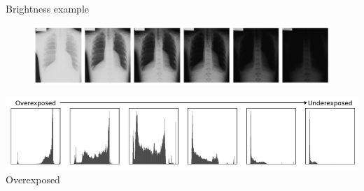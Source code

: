 \documentclass[9pt, aspectratio=169]{beamer}
\begin{document}
\begin{frame}
    {Brightness example}
    \centering
    \begin{figure}
        \includegraphics[width=\textwidth]{xray_brightness_Veldkamp_2009.png}
        \caption{\small{\color{gray}{Same X-ray, decreasing brightness - Image from Veldkamp et al., 2009}}}
    \end{figure}
    \includegraphics[width=\textwidth]{xray_brightness_Veldkamp_2009_histos.png}
    Overexposed
\end{frame}
\end{document}
